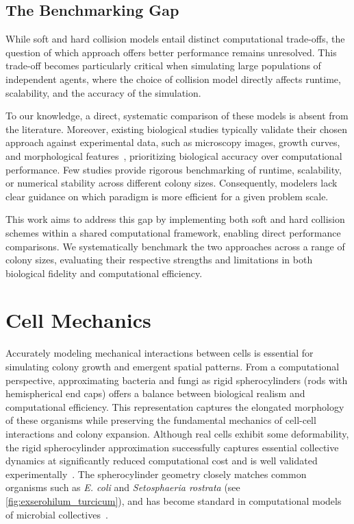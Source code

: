 \documentclass[conference]{IEEEtran}
\begin{document}
\newpage

\subsection{The Benchmarking Gap}

While soft and hard collision models entail distinct computational trade-offs, the question of which approach offers better performance remains unresolved. This trade-off becomes particularly critical when simulating large populations of independent agents, where the choice of collision model directly affects runtime, scalability, and the accuracy of the simulation.

To our knowledge, a direct, systematic comparison of these models is absent from the literature. Moreover, existing biological studies typically validate their chosen approach against experimental data, such as microscopy images, growth curves, and morphological features~\cite{Rudge2012,Weady2024,Blanchard2015,Ghosh2015,You2018,Warren2019,Khan_2024,You_2021,Valdez2025,Rudge2013,Langeslay_2023}, prioritizing biological accuracy over computational performance. Few studies provide rigorous benchmarking of runtime, scalability, or numerical stability across different colony sizes. Consequently, modelers lack clear guidance on which paradigm is more efficient for a given problem scale.

This work aims to address this gap by implementing both soft and hard collision schemes within a shared computational framework, enabling direct performance comparisons. We systematically benchmark the two approaches across a range of colony sizes, evaluating their respective strengths and limitations in both biological fidelity and computational efficiency.

\section{Cell Mechanics}

Accurately modeling mechanical interactions between cells is essential for simulating colony growth and emergent spatial patterns. From a computational perspective, approximating bacteria and fungi as rigid spherocylinders (rods with hemispherical end caps) offers a balance between biological realism and computational efficiency. This representation captures the elongated morphology of these organisms while preserving the fundamental mechanics of cell-cell interactions and colony expansion. Although real cells exhibit some deformability, the rigid spherocylinder approximation successfully captures essential collective dynamics at significantly reduced computational cost and is well validated experimentally~\cite{Rudge2012,Khan_2024,Rudge2013,Langeslay_2023,Ghosh2015}. The spherocylinder geometry closely matches common organisms such as \textit{E. coli} and \textit{Setosphaeria rostrata} (see \autoref{fig:exserohilum_turcicum}), and has become standard in computational models of microbial collectives~\cite{You2018, Weady2024, Blanchard2015, Warren2019, Ghosh2015}.
\end{document}
